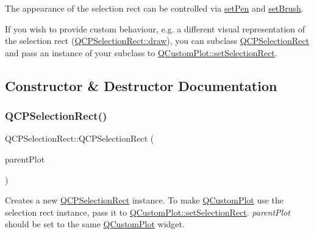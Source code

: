 The appearance of the selection rect can be controlled via \mbox{\hyperlink{class_q_c_p_selection_rect_ada20b7fb1b2dcbe50523262636b06963}{set\+Pen}} and \mbox{\hyperlink{class_q_c_p_selection_rect_ab0c66f1484418782efa01f4153611080}{set\+Brush}}.

If you wish to provide custom behaviour, e.\+g. a different visual representation of the selection rect (\mbox{\hyperlink{class_q_c_p_selection_rect_ab0e50ae796508bdcd97ab8c335c593bf}{Q\+C\+P\+Selection\+Rect\+::draw}}), you can subclass \mbox{\hyperlink{class_q_c_p_selection_rect}{Q\+C\+P\+Selection\+Rect}} and pass an instance of your subclass to \mbox{\hyperlink{class_q_custom_plot_a0c09f96df15faa4799ad7051bb16cf33}{Q\+Custom\+Plot\+::set\+Selection\+Rect}}. 

\subsection{Constructor \& Destructor Documentation}
\mbox{\label{class_q_c_p_selection_rect_ade6ee59fabcc585a1e281eb527b01867}} 
\subsubsection{\texorpdfstring{QCPSelectionRect()}{QCPSelectionRect()}}
{\footnotesize\ttfamily Q\+C\+P\+Selection\+Rect\+::\+Q\+C\+P\+Selection\+Rect (\begin{DoxyParamCaption}\item[{\mbox{\hyperlink{class_q_custom_plot}{Q\+Custom\+Plot}} $\ast$}]{parent\+Plot }\end{DoxyParamCaption})\hspace{0.3cm}{\ttfamily [explicit]}}

Creates a new \mbox{\hyperlink{class_q_c_p_selection_rect}{Q\+C\+P\+Selection\+Rect}} instance. To make \mbox{\hyperlink{class_q_custom_plot}{Q\+Custom\+Plot}} use the selection rect instance, pass it to \mbox{\hyperlink{class_q_custom_plot_a0c09f96df15faa4799ad7051bb16cf33}{Q\+Custom\+Plot\+::set\+Selection\+Rect}}. {\itshape parent\+Plot} should be set to the same \mbox{\hyperlink{class_q_custom_plot}{Q\+Custom\+Plot}} widget. \mbox{\label{class_q_c_p_selection_rect_aded186aabcdc3ee51775b7c5063e199a}} 
